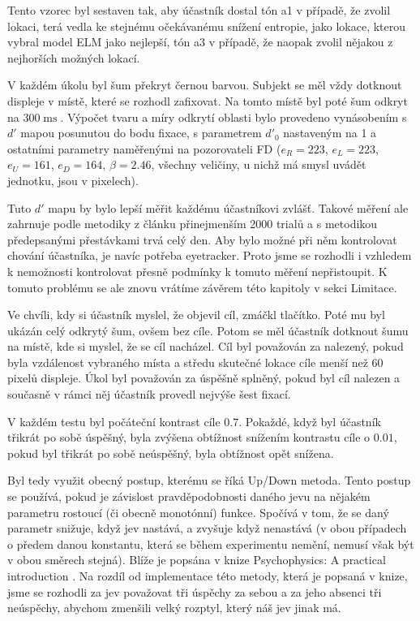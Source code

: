 Tento vzorec byl sestaven tak, aby účastník dostal tón a1 v případě, že zvolil
lokaci, terá vedla ke stejnému očekávanému snížení entropie, jako lokace,
kterou vybral model ELM jako nejlepší, tón a3 v případě, že naopak zvolil
nějakou z nejhorších možných lokací.

V každém úkolu byl šum překryt černou barvou. Subjekt se měl vždy dotknout
displeje v místě, které se rozhodl zafixovat. Na tomto místě byl poté šum
odkryt na $300 \operatorname{ms}$. Výpočet tvaru a míry odkrytí oblasti bylo
provedeno vynásobením s $d'$ mapou posunutou do bodu fixace, s parametrem
$d'_0$ nastaveným na 1 a ostatními parametry naměřenými na pozorovateli FD
($e_R=223$, $e_L=223$, $e_U = 161$, $e_D = 164$, $\beta=2.46$, všechny
veličiny, u nichž má smysl uvádět jednotku, jsou v pixelech).

Tuto $d'$ mapu by bylo lepší měřit každému účastníkovi
zvlášť. Takové měření ale zahrnuje podle metodiky z článku \citep{Ellipse}
přinejmenším 2000 trialů a s metodikou předepsanými přestávkami trvá celý den.
Aby bylo možné při něm kontrolovat chování účastníka, je navíc potřeba
eyetracker. Proto jsme se rozhodli i vzhledem k nemožnosti kontrolovat přesně
podmínky k tomuto měření nepřistoupit. K tomuto problému se ale znovu vrátíme
závěrem této kapitoly v sekci Limitace.  

Ve chvíli, kdy si účastník myslel, že objevil cíl, zmáčkl tlačítko. Poté mu byl
ukázán celý odkrytý šum, ovšem bez cíle. Potom se měl účastník dotknout šumu na
místě, kde si myslel, že se cíl nacházel. Cíl byl považován za nalezený, pokud
byla vzdálenost vybraného místa a středu skutečné lokace cíle menší než 60
pixelů displeje. Úkol byl považován za úspěšně splněný, pokud byl cíl nalezen a
současně v rámci něj účastník provedl nejvýše šest fixací. 

V každém testu byl počáteční kontrast cíle $0.7$. Pokaždé, když byl účastník
třikrát po sobě úspěšný, byla zvýšena obtížnost snížením kontrastu cíle o
$0.01$, pokud byl třikrát po sobě neúspěšný, byla obtížnost opět snížena. 

Byl tedy využit obecný postup, kterému se říká Up/Down metoda. Tento postup se
používá, pokud je závislost pravděpodobnosti daného jevu na nějakém parametru
rostoucí (či obecně monotónní) funkce. Spočívá v tom, že se daný parametr
snižuje, když jev nastává, a zvyšuje když nenastává (v obou případech o předem
danou konstantu, která se během experimentu nemění, nemusí však být v obou
směrech stejná). Blíže je popsána v knize Psychophysics: A practical
introduction \citep{psychophysics}.  Na rozdíl od implementace této metody,
která je popsaná v knize, jsme se rozhodli za jev považovat tři úspěchy za
sebou a za jeho absenci tři neúspěchy, abychom zmenšili velký rozptyl, který
náš jev jinak má.

